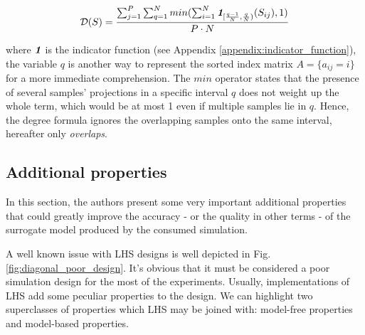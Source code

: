 \documentclass[12pt]{extarticle}
\newcommand{\mfigref}[1]{Fig.\ref{#1}}
\newcommand{\mappendixref}[1]{Appendix \ref{#1}}
\newcommand{\indfunc}[1]{\textit{\textbf{1}}_{#1}}
\begin{document}
\begin{equation}
\label{eq:degree}
\mathcal{D}(S) = \frac{\sum^P_{j=1}\sum^N_{q=1} min(\sum^N_{i=1}\indfunc{[\frac{q-1}{N}, \frac{q}{N})}(S_{ij}), 1)}{P \cdot N}
\end{equation}

where $\indfunc{}$ is the indicator function (see \mappendixref{appendix:indicator_function}), the variable $q$ is another way to represent the sorted index matrix $A = \{a_{ij} = i \}$ for a more immediate comprehension. The $min$ operator states that the presence of several samples' projections in a specific interval $q$ does not weight up the whole term, which would be at most 1 even if multiple samples lie in $q$. Hence, the degree formula ignores the overlapping samples onto the same interval, hereafter only \textit{overlaps}.

\subsection{Additional properties}
\label{subsec:lhs_properties}
In this section, the authors present some very important additional properties that could greatly improve the accuracy - or the quality in other terms - of the surrogate model produced by the consumed simulation.

A well known issue with LHS designs is well depicted in \mfigref{fig:diagonal_poor_design}. It's obvious that it must be considered a poor simulation design for the most of the experiments. Usually, implementations of LHS add some peculiar properties to the design. We can highlight two superclasses of properties which LHS may be joined with: model-free properties and model-based properties.
\end{document}
